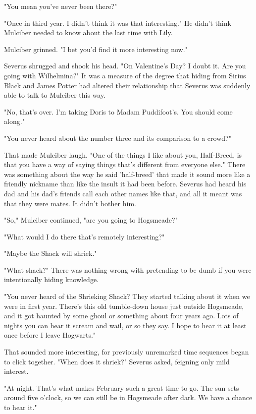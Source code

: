 \documentclass[a4paper,11pt]{article}
\begin{document}
"You mean you've never been there?"

"Once in third year. I didn't think it was that interesting." He didn't think Mulciber needed to know about the last time with Lily.

Mulciber grinned. "I bet you'd find it more interesting now."

Severus shrugged and shook his head. "On Valentine's Day? I doubt it. Are you going with Wilhelmina?" It was a measure of the degree that hiding from Sirius Black and James Potter had altered their relationship that Severus was suddenly able to talk to Mulciber this way.

"No, that's over. I'm taking Doris to Madam Puddifoot's. You should come along."

"You never heard about the number three and its comparison to a crowd?"

That made Mulciber laugh. "One of the things I like about you, Half-Breed, is that you have a way of saying things that's different from everyone else." There was something about the way he said 'half-breed' that made it sound more like a friendly nickname than like the insult it had been before. Severus had heard his dad and his dad's friends call each other names like that, and all it meant was that they were mates. It didn't bother him.

"So," Mulciber continued, "are you going to Hogsmeade?"

"What would I do there that's remotely interesting?"

"Maybe the Shack will shriek."

"What shack?" There was nothing wrong with pretending to be dumb if you were intentionally hiding knowledge.

"You never heard of the Shrieking Shack? They started talking about it when we were in first year. There's this old tumble-down house just outside Hogsmeade, and it got haunted by some ghoul or something about four years ago. Lots of nights you can hear it scream and wail, or so they say. I hope to hear it at least once before I leave Hogwarts."

That sounded more interesting, for previously unremarked time sequences began to click together. "When does it shriek?" Severus asked, feigning only mild interest.

"At night. That's what makes February such a great time to go. The sun sets around five o'clock, so we can still be in Hogsmeade after dark. We have a chance to hear it."
\end{document}
